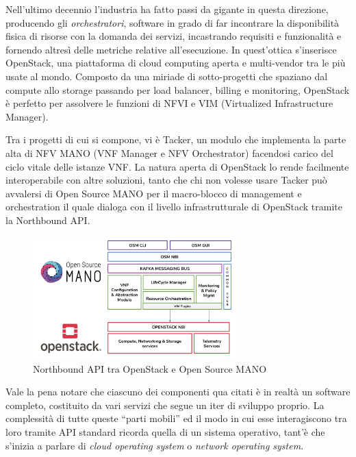 Nell'ultimo decennio l'industria ha fatto passi da gigante in questa direzione, producendo gli \textit{orchestratori}, software in grado di far incontrare la disponibilità fisica di risorse con la domanda dei servizi, incastrando requisiti e funzionalità e fornendo altresì delle metriche relative all'esecuzione. In quest'ottica s'inserisce OpenStack, una piattaforma di cloud computing aperta e multi-vendor tra le più usate al mondo. Composto da una miriade di sotto-progetti che spaziano dal compute allo storage passando per load balancer, billing e monitoring, OpenStack è perfetto per assolvere le funzioni di NFVI e VIM (Virtualized Infrastructure Manager).

Tra i progetti di cui si compone, vi è Tacker, un modulo che implementa la parte alta di NFV MANO (VNF Manager e NFV Orchestrator) facendosi carico del ciclo vitale delle istanze VNF. La natura aperta di OpenStack lo rende facilmente interoperabile con altre soluzioni, tanto che chi non volesse usare Tacker può avvalersi di Open Source MANO per il macro-blocco di management e orchestration il quale dialoga con il livello infrastrutturale di OpenStack tramite la Northbound API.

\begin{figure}[htb]
    \includegraphics[width=0.7\textwidth]{graphics/openstack-mano.png}
    \caption{Northbound API tra OpenStack e Open Source MANO}
    \label{fig:openstack-mano}
\end{figure}

Vale la pena notare che ciascuno dei componenti qua citati è in realtà un software completo, costituito da vari servizi che segue un iter di sviluppo proprio. La complessità di tutte queste ``parti mobili'' ed il modo in cui esse interagiscono tra loro tramite API standard ricorda quella di un sistema operativo, tant'è che s'inizia a parlare di \textit{cloud operating system} o \textit{network operating system}.


